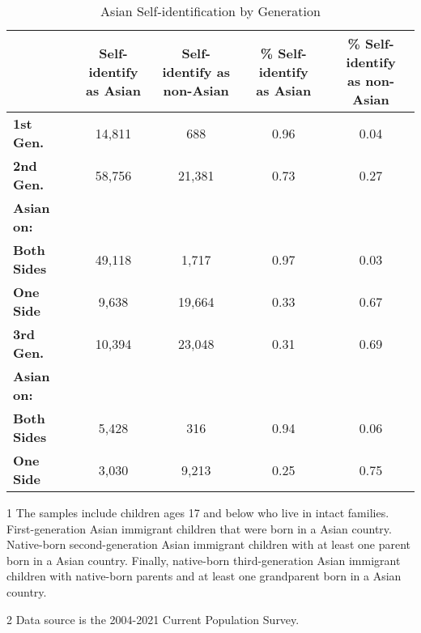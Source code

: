 \begin{table}[H]
\centering\centering
\caption{Asian Self-identification by Generation \label{tab:hispbygen}}
\centering
\begin{threeparttable}
\begin{tabular}[t]{>{}lcccc}
\toprule
  & \specialcell{Self-identify \\ as Asian} & \specialcell{Self-identify as \\ non-Asian} & \specialcell{\% Self-identify \\ as Asian} & \specialcell{\% Self-identify \\ as non-Asian}\\
\midrule
\textbf{1st Gen.} & 14,811 & 688 & 0.96 & 0.04\\
\textbf{2nd Gen.} & 58,756 & 21,381 & 0.73 & 0.27\\
\hspace{1em}\textbf{Asian on:} &  &  &  \vphantom{1} & \\
\hspace{1em}\hspace{1em}\textbf{Both Sides} & 49,118 & 1,717 & 0.97 & 0.03\\
\hspace{1em}\hspace{1em}\textbf{One Side} & 9,638 & 19,664 & 0.33 & 0.67\\
\addlinespace
\textbf{3rd Gen.} & 10,394 & 23,048 & 0.31 & 0.69\\
\hspace{1em}\textbf{Asian on:} &  &  &  & \\
\hspace{1em}\hspace{1em}\textbf{Both Sides} & 5,428 & 316 & 0.94 & 0.06\\
\hspace{1em}\hspace{1em}\textbf{One Side} & 3,030 & 9,213 & 0.25 & 0.75\\
\bottomrule
\end{tabular}
\begin{tablenotes}
\item[1] The samples include children ages 17 and below who live in intact families. First-generation Asian immigrant children that were born in a Asian country. Native-born second-generation Asian immigrant children with at least one parent born in a Asian country. Finally, native-born third-generation Asian immigrant children with native-born parents and at least one grandparent born in a Asian country.
\item[2] Data source is the 2004-2021 Current Population Survey.
\end{tablenotes}
\end{threeparttable}
\end{table}
